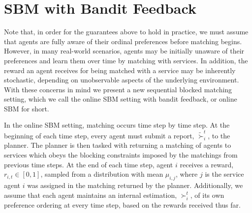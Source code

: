 \documentclass[letterpaper,11pt]{article}
\begin{document}

\section{SBM with Bandit Feedback}
\label{sec:bandit}
Note that, in order for the guarantees above to hold in practice, we must assume that agents are fully aware of their ordinal preferences before matching begins. However, in many real-world scenarios, agents may be initially unaware of their preferences and learn them over time by matching with services. In addition, the reward an agent receives for being matched with a service may be inherently stochastic, depending on unobservable aspects of the underlying environment. With these concerns in mind we present a new sequential blocked matching setting, which we call the online SBM setting with bandit feedback, or online SBM for short.

In the online SBM setting, matching occurs time step by time step. At the beginning of each time step, every agent must submit a report, $\tilde{\succ}^{t}_{i}$, to the planner. The planner is then tasked with returning a matching of agents to services which obeys the blocking constraints imposed by the matchings from previous time steps. At the end of each time step, agent $i$ receives a reward, $r_{i,t} \in [0, 1]$, sampled from a distribution with mean $\mu_{i,j}$, where $j$ is the service agent $i$ was assigned in the matching returned by the planner. Additionally, we assume that each agent maintains an internal estimation, $\succ^{t}_{i}$, of its own preference ordering at every time step, based on the rewards received thus far.
\end{document}
